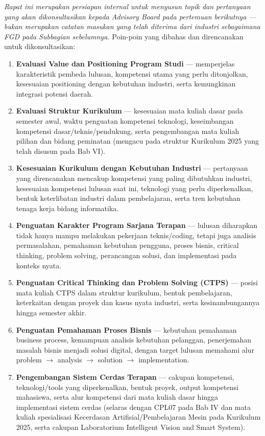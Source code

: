 \textit{Rapat ini merupakan persiapan internal untuk menyusun topik dan pertanyaan yang akan dikonsultasikan kepada Advisory Board pada pertemuan berikutnya --- bukan merupakan catatan masukan yang telah diterima dari industri sebagaimana FGD pada Subbagian sebelumnya.} Poin-poin yang dibahas dan direncanakan untuk dikonsultasikan:

\begin{enumerate}
\item \textbf{Evaluasi Value dan Positioning Program Studi} --- memperjelas karakteristik pembeda lulusan, kompetensi utama yang perlu ditonjolkan, kesesuaian positioning dengan kebutuhan industri, serta kemungkinan integrasi potensi daerah.
\item \textbf{Evaluasi Struktur Kurikulum} --- kesesuaian mata kuliah dasar pada semester awal, waktu penguatan kompetensi teknologi, keseimbangan kompetensi dasar/teknis/pendukung, serta pengembangan mata kuliah pilihan dan bidang peminatan (mengacu pada struktur Kurikulum 2025 yang telah disusun pada Bab VI).
\item \textbf{Kesesuaian Kurikulum dengan Kebutuhan Industri} --- pertanyaan yang direncanakan mencakup kompetensi yang paling dibutuhkan industri, kesesuaian kompetensi lulusan saat ini, teknologi yang perlu diperkenalkan, bentuk keterlibatan industri dalam pembelajaran, serta tren kebutuhan tenaga kerja bidang informatika.
\item \textbf{Penguatan Karakter Program Sarjana Terapan} --- lulusan diharapkan tidak hanya mampu melakukan pekerjaan teknis/coding, tetapi juga analisis permasalahan, pemahaman kebutuhan pengguna, proses bisnis, critical thinking, problem solving, perancangan solusi, dan implementasi pada konteks nyata.
\item \textbf{Penguatan Critical Thinking dan Problem Solving (CTPS)} --- posisi mata kuliah CTPS dalam struktur kurikulum, bentuk pembelajaran, keterkaitan dengan proyek dan kasus nyata industri, serta kesinambungannya hingga semester akhir.
\item \textbf{Penguatan Pemahaman Proses Bisnis} --- kebutuhan pemahaman business process, kemampuan analisis kebutuhan pelanggan, penerjemahan masalah bisnis menjadi solusi digital, dengan target lulusan memahami alur problem $\to$ analysis $\to$ solution $\to$ implementation.
\item \textbf{Pengembangan Sistem Cerdas Terapan} --- cakupan kompetensi, teknologi/tools yang diperkenalkan, bentuk proyek, output kompetensi mahasiswa, serta alur kompetensi dari mata kuliah dasar hingga implementasi sistem cerdas (selaras dengan CPL07 pada Bab IV dan mata kuliah spesialisasi Kecerdasan Artifisial/Pembelajaran Mesin pada Kurikulum 2025, serta cakupan Laboratorium Intelligent Vision and Smart System).

\end{enumerate}
